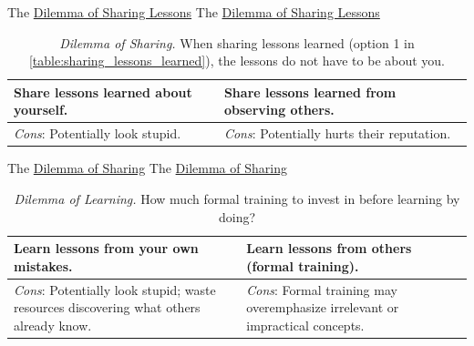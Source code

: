 The \href{table:sharing_lessons_learned}{Dilemma of Sharing Lessons}
The \href{table:sharing_lessons_learned}{Dilemma of Sharing Lessons}


\begin{center}
\begin{table}[H] %
\begin{tabular}{ | m{\dilemmatablewidth}| m{\dilemmatablewidth} | } 
  \hline
  \textbf{Share lessons learned about yourself.} & 
  \textbf{Share lessons learned from observing others.} \\ 
  \hline
  \textit{Cons}: Potentially look stupid. & 
  \textit{Cons}: Potentially hurts their reputation. \\  
  \hline
\end{tabular}
\caption{
\textit{Dilemma of Sharing.}
When sharing lessons learned (option 1 in \ref{table:sharing_lessons_learned}), the lessons do not have to be about you. 
}
\label{table:share_lessons_learned}
\end{table}
\end{center}


The \href{table:share_lessons_learned}{Dilemma of Sharing}
The \href{table:share_lessons_learned}{Dilemma of Sharing}


\begin{center}
\begin{table}[H] %
\begin{tabular}{ | m{\dilemmatablewidth}| m{\dilemmatablewidth} | } 
  \hline
  \textbf{Learn lessons from your own mistakes.} & 
  \textbf{Learn lessons from others (formal training).} \\ 
  \hline
  \textit{Cons}: Potentially look stupid; waste resources discovering what others already know. & 
  \textit{Cons}: Formal training may overemphasize irrelevant or impractical concepts. \\  
  \hline
\end{tabular}
\caption{
\textit{Dilemma of Learning.}
How much formal training to invest in before learning by doing?
}
\label{table:lessons_learned_source}
\end{table}
\end{center}


